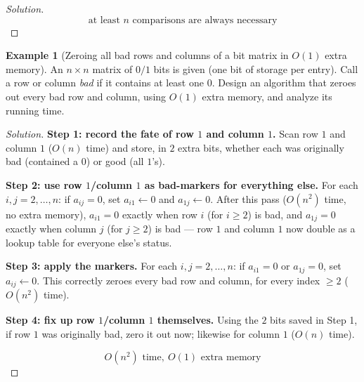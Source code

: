 \documentclass[11pt]{article}
\theoremstyle{definition}
\newtheorem{example}{Example}[section]
\begin{document}
\begin{proof}[Solution]
\[
\boxed{\text{at least }n\text{ comparisons are always necessary}}
\]
\end{proof}

\begin{example}[Zeroing all bad rows and columns of a bit matrix in $O(1)$ extra memory]
An $n\times n$ matrix of $0/1$ bits is given (one bit of storage per entry). Call a row or column \emph{bad} if it contains at least one $0$. Design an algorithm that zeroes out every bad row and column, using $O(1)$ extra memory, and analyze its running time.
\end{example}
\begin{proof}[Solution]
\textbf{Step 1: record the fate of row $1$ and column $1$.} Scan row $1$ and column $1$ ($O(n)$ time) and store, in $2$ extra bits, whether each was originally bad (contained a $0$) or good (all $1$'s).

\textbf{Step 2: use row $1$/column $1$ as bad-markers for everything else.} For each $i,j=2,\dots,n$: if $a_{ij}=0$, set $a_{i1}\leftarrow0$ and $a_{1j}\leftarrow0$. After this pass ($O(n^2)$ time, no extra memory), $a_{i1}=0$ exactly when row $i$ (for $i\ge2$) is bad, and $a_{1j}=0$ exactly when column $j$ (for $j\ge2$) is bad — row $1$ and column $1$ now double as a lookup table for everyone else's status.

\textbf{Step 3: apply the markers.} For each $i,j=2,\dots,n$: if $a_{i1}=0$ or $a_{1j}=0$, set $a_{ij}\leftarrow0$. This correctly zeroes every bad row and column, for every index $\ge2$ ($O(n^2)$ time).

\textbf{Step 4: fix up row $1$/column $1$ themselves.} Using the $2$ bits saved in Step 1, if row $1$ was originally bad, zero it out now; likewise for column $1$ ($O(n)$ time).

\[
\boxed{O(n^2)\text{ time},\ O(1)\text{ extra memory}}
\]
\end{proof}
\end{document}
